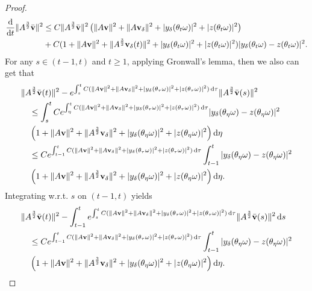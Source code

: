\documentclass{elsarticle}
\theoremstyle{definition}
\numberwithin{equation}{section}
\renewcommand{\d}{{\rm{d}}}
\begin{document}
\begin{proof}
\begin{align*}
\frac{\d}{\d t}\|A^\frac32\bar{\textbf{v}}\|^2
&\leq C\|A^\frac32\bar{\textbf{v}}\|^2 \left ( \|A\textbf{v}\|^2+\|A\textbf{v}_\delta\|^2+|y_\delta(\theta_t\omega)|^2+|z(\theta_t\omega)|^2 \right )
\nonumber\\
 &+C(1+\|A\textbf{v}\|^2+\|A^\frac32\textbf{v}_\delta(t)\|^2+|y_\delta(\theta_t\omega)|^2+
 |z(\theta_t\omega)|^2)|y_\delta(\theta_t\omega)-z(\theta_t\omega)|^2.
\end{align*}
For any $s\in(t-1,t)$ and $t\geq 1$, applying Gronwall's lemma, then  we also can get that
\begin{align*}
&\|A^\frac32\bar{\textbf{v}}(t)\|^2
-e^{\int_s^tC(\|A\textbf{v}\|^2+\|A\textbf{v}_\delta\|^2+|y_\delta(\theta_\tau\omega)|^2+|z(\theta_\tau\omega)|^2 )\, \d \tau}\|A^\frac32\bar{\textbf{v}}(s)\|^2\nonumber\\
&\quad \leq \int_s^tCe^{\int_\eta^tC( \|A\textbf{v}\|^2+\|A\textbf{v}_\delta\|^2+|y_\delta(\theta_\tau\omega)|^2+|z(\theta_\tau\omega)|^2)\, \d \tau}
 |y_\delta(\theta_\eta\omega)-z(\theta_\eta\omega)|^2\nonumber\\
  &\quad \left(1+\|A\textbf{v}\|^2
 +\|A^\frac32\textbf{v}_\delta\|^2+|y_\delta(\theta_\eta\omega)|^2+
 |z(\theta_\eta\omega)|^2\right) \d \eta\nonumber\\
&\quad \leq Ce^{\int_{t-1}^tC( \|A\textbf{v}\|^2+\|A\textbf{v}_\delta\|^2+|y_\delta(\theta_\tau\omega)|^2+|z(\theta_\tau\omega)|^2)\, \d \tau}
\int_{t-1}^t|y_\delta(\theta_\eta\omega)-z(\theta_\eta\omega)|^2\nonumber\\
  &\quad \left(1+\|A\textbf{v}\|^2
 +\|A^\frac32\textbf{v}_\delta\|^2+|y_\delta(\theta_\eta\omega)|^2+
 |z(\theta_\eta\omega)|^2\right) \d \eta.
\end{align*}
Integrating w.r.t. $s$ on $(t-1,t)$ yields
\begin{align}\label{9.16}
&\|A^\frac32\bar{\textbf{v}}(t)\|^2
-\int_{t-1}^te^{\int_s^tC( \|A\textbf{v}\|^2+\|A\textbf{v}_\delta\|^2+|y_\delta(\theta_\tau\omega)|^2+|z(\theta_\tau\omega)|^2)\, \d \tau}\|A^\frac32\bar{\textbf{v}}(s)\|^2\, \d s\nonumber\\
&\quad \leq Ce^{\int_{t-1}^tC( \|A\textbf{v}\|^2+\|A\textbf{v}_\delta\|^2+|y_\delta(\theta_\tau\omega)|^2+|z(\theta_\tau\omega)|^2)\, \d \tau}
\int_{t-1}^t|y_\delta(\theta_\eta\omega)-z(\theta_\eta\omega)|^2\nonumber\\
  &\quad \left(1+\|A\textbf{v}\|^2
 +\|A^\frac32\textbf{v}_\delta\|^2+|y_\delta(\theta_\eta\omega)|^2+
 |z(\theta_\eta\omega)|^2\right) \d \eta.
\end{align}


\end{proof}
\end{document}

